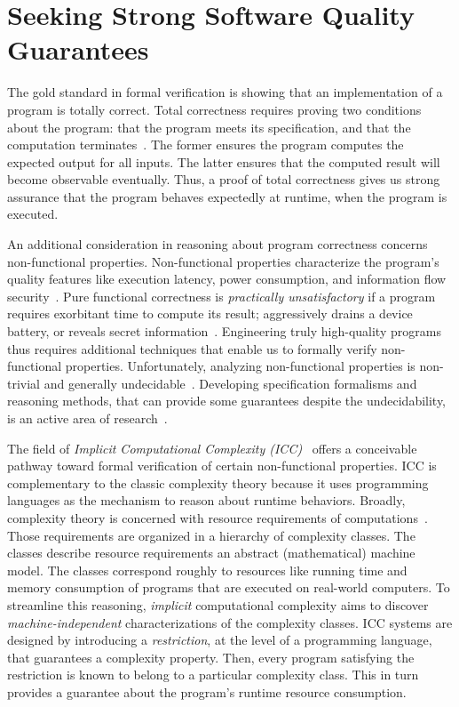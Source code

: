 \section{Seeking Strong Software Quality Guarantees}
\label{sec:aicc-intro}

The gold standard in formal verification is showing
that an implementation of a program is {totally correct}. Total correctness requires proving two conditions about the
program: that the program meets its specification, and
that the computation terminates~\cite{leino2023}. The former ensures the program
computes the expected output for all inputs. The latter ensures that the
computed result will become observable {eventually}. Thus, a proof of total
correctness gives us strong assurance that the program behaves expectedly at
runtime, \ie when the program is executed.

An additional consideration in reasoning about program correctness concerns
{non-functional} properties. Non-functional
properties characterize the program's quality features like execution latency,
power consumption, and information flow security~\cite{terbeek2018}. Pure
functional correctness is \emph{practically unsatisfactory} if a program
requires exorbitant time to compute its result; aggressively drains a device
battery, or reveals secret information~\cite{heraud2011,aubert20222}.
Engineering truly high-quality programs thus requires additional techniques that
enable us to formally verify non-functional properties. Unfortunately, analyzing
non-functional properties is non-trivial and generally
undecidable~\cite{rice1953}. Developing specification
formalisms and reasoning methods, that can provide some guarantees despite the
undecidability, is an active area of research~\cite{etaps2025}.

The field of \emph{Implicit Computational Complexity (ICC)}~\cite{dallago2011}%
offers a
conceivable pathway toward formal verification of certain non-functional
properties. ICC is complementary to the classic complexity
theory because it uses programming languages as the
{mechanism} to reason about runtime behaviors. Broadly, complexity theory is
concerned with resource requirements of computations~\cite{goldreich2008}. Those
requirements are organized in a hierarchy of {complexity
classes}. The classes describe resource requirements
\wrt an abstract (mathematical) machine model. The classes correspond roughly to
resources like running time and memory consumption of programs that are executed
on real-world computers. To streamline this reasoning, \emph{implicit}
computational complexity aims to discover \emph{machine-independent}
characterizations of the complexity classes. ICC systems are designed by
introducing a \emph{restriction}, at the level of a programming language, that
guarantees a complexity property. Then, every program satisfying the restriction
is known to belong to a particular complexity class. This in turn provides a
guarantee about the program's runtime resource consumption.

